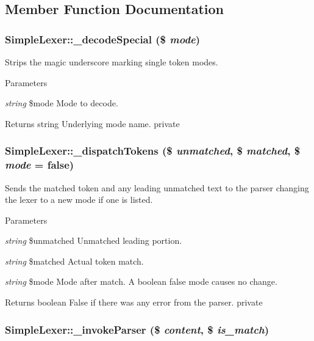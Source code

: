 \subsection{Member Function Documentation}
\hypertarget{class_simple_lexer_a64f7cbf4238a99aaa177d64dd3614b82}{
\subsubsection[{\_\-decodeSpecial}]{\setlength{\rightskip}{0pt plus 5cm}SimpleLexer::\_\-decodeSpecial (\$ {\em mode})}}
\label{class_simple_lexer_a64f7cbf4238a99aaa177d64dd3614b82}
Strips the magic underscore marking single token modes. 
\begin{DoxyParams}{Parameters}
\item[{\em string}]\$mode Mode to decode. \end{DoxyParams}
\begin{DoxyReturn}{Returns}
string Underlying mode name.  private 
\end{DoxyReturn}
\hypertarget{class_simple_lexer_a6dd073c1e7bbc77a4aafd9ac23bba172}{
\subsubsection[{\_\-dispatchTokens}]{\setlength{\rightskip}{0pt plus 5cm}SimpleLexer::\_\-dispatchTokens (\$ {\em unmatched}, \/  \$ {\em matched}, \/  \$ {\em mode} = {\ttfamily false})}}
\label{class_simple_lexer_a6dd073c1e7bbc77a4aafd9ac23bba172}
Sends the matched token and any leading unmatched text to the parser changing the lexer to a new mode if one is listed. 
\begin{DoxyParams}{Parameters}
\item[{\em string}]\$unmatched Unmatched leading portion. \item[{\em string}]\$matched Actual token match. \item[{\em string}]\$mode Mode after match. A boolean false mode causes no change. \end{DoxyParams}
\begin{DoxyReturn}{Returns}
boolean False if there was any error from the parser.  private 
\end{DoxyReturn}
\hypertarget{class_simple_lexer_a287ef4470e221f5b348fbda97a88a70f}{
\subsubsection[{\_\-invokeParser}]{\setlength{\rightskip}{0pt plus 5cm}SimpleLexer::\_\-invokeParser (\$ {\em content}, \/  \$ {\em is\_\-match})}}
